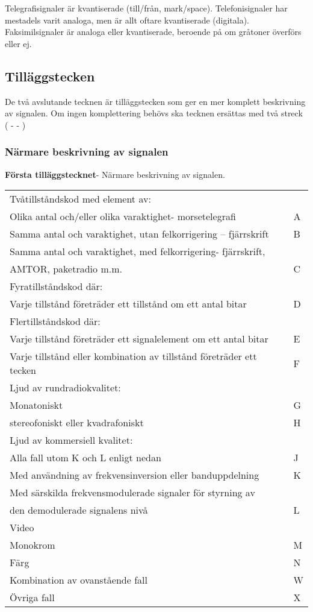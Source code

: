Telegrafisignaler är kvantiserade (till/från, mark/space).
Telefonisignaler har mestadels varit analoga, men är allt oftare
kvantiserade (digitala).
Faksimilsignaler är analoga eller kvantiserade, beroende på om gråtoner
överförs eller ej.


\subsection{Tilläggstecken}
De två avslutande tecknen är tilläggstecken som ger en mer komplett
beskrivning av signalen.
Om ingen komplettering behövs ska tecknen ersättas med två streck ( - - )

\subsubsection{Närmare beskrivning av signalen}
\textbf{Första tilläggstecknet}- Närmare beskrivning av signalen.\\
\begin{tabular}{ll}
	Tvåtillståndskod med element av: &\\
	Olika antal och/eller olika varaktighet- morsetelegrafi & A\\
	Samma antal och varaktighet, utan felkorrigering -- fjärrskrift & B\\
	Samma antal och varaktighet, med felkorrigering- fjärrskrift, &\\
	AMTOR, paketradio m.m. & C\\
	Fyratillståndskod där: &\\
	Varje tillstånd företräder ett tillstånd om ett antal bitar & D\\
	Flertillståndskod där: &\\
	Varje tillstånd företräder ett signalelement om ett antal bitar & E\\
	Varje tillstånd eller kombination av tillstånd företräder ett tecken & F\\
	Ljud av rundradiokvalitet: & \\
	Monatoniskt & G\\
	stereofoniskt eller kvadrafoniskt & H\\
	Ljud av kommersiell kvalitet: &\\
	Alla fall utom K och L enligt nedan & J\\
	Med användning av frekvensinversion eller banduppdelning & K\\
	Med särskilda frekvensmodulerade signaler för styrning av &\\
	den demodulerade signalens nivå & L\\
	Video &\\
	Monokrom & M\\
	Färg & N\\
	Kombination av ovanstående fall & W\\
	Övriga fall & X\\
\end{tabular}

